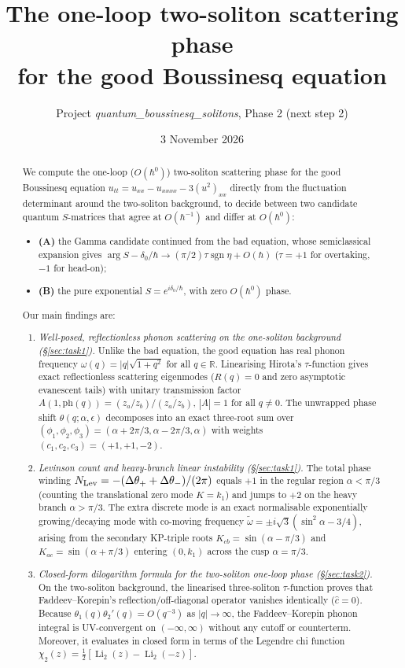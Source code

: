 \documentclass[11pt,a4paper]{article}
\title{The one-loop two-soliton scattering phase\\ for the good Boussinesq equation}
\author{Project \emph{quantum\_boussinesq\_solitons}, Phase 2 (next step 2)}
\date{3 November 2026}
\theoremstyle{remark}
\begin{document}
\maketitle

\begin{abstract}
We compute the one-loop ($O(\hbar^0)$) two-soliton scattering phase for the good Boussinesq equation $u_{tt}=u_{xx}-u_{xxxx}-3(u^2)_{xx}$ directly from the fluctuation determinant around the two-soliton background, to decide between two candidate quantum $S$-matrices that agree at $O(\hbar^{-1})$ and differ at $O(\hbar^0)$:
\begin{itemize}
\item \textbf{(A)} the Gamma candidate continued from the bad equation, whose semiclassical expansion gives $\arg S-\delta_0/\hbar\to(\pi/2)\tau\operatorname{sgn}\eta+O(\hbar)$ ($\tau=+1$ for overtaking, $-1$ for head-on);
\item \textbf{(B)} the pure exponential $S=e^{i\delta_0/\hbar}$, with zero $O(\hbar^0)$ phase.
\end{itemize}
Our main findings are:
\begin{enumerate}
\item \emph{Well-posed, reflectionless phonon scattering on the one-soliton background (\S\ref{sec:task1}).} Unlike the bad equation, the good equation has real phonon frequency $\omega(q)=|q|\sqrt{1+q^2}$ for all $q\in\mathbb{R}$. Linearising Hirota's $\tau$-function gives exact reflectionless scattering eigenmodes ($R(q)=0$ and zero asymptotic evanescent tails) with unitary transmission factor $A(1,\mathrm{ph}(q))=(z_a/z_b)/\overline{(z_a/z_b)}$, $|A|=1$ for all $q\neq 0$. The unwrapped phase shift $\theta(q;\alpha,\epsilon)$ decomposes into an exact three-root sum over $(\phi_1,\phi_2,\phi_3)=(\alpha+2\pi/3,\alpha-2\pi/3,\alpha)$ with weights $(c_1,c_2,c_3)=(+1,+1,-2)$.
\item \emph{Levinson count and heavy-branch linear instability (\S\ref{sec:task1}).} The total phase winding $N_{\rm Lev}=-(\Delta\theta_++\Delta\theta_-)/(2\pi)$ equals $+1$ in the regular region $\alpha<\pi/3$ (counting the translational zero mode $K=k_1$) and jumps to $+2$ on the heavy branch $\alpha>\pi/3$. The extra discrete mode is an exact normalisable exponentially growing/decaying mode with co-moving frequency $\tilde\omega=\pm i\sqrt{3}(\sin^2\alpha-3/4)$, arising from the secondary KP-triple roots $K_{cb}=\sin(\alpha-\pi/3)$ and $K_{ac}=\sin(\alpha+\pi/3)$ entering $(0,k_1)$ across the cusp $\alpha=\pi/3$.
\item \emph{Closed-form dilogarithm formula for the two-soliton one-loop phase (\S\ref{sec:task2}).} On the two-soliton background, the linearised three-soliton $\tau$-function proves that Faddeev--Korepin's reflection/off-diagonal operator vanishes identically ($\hat{c}=0$). Because $\theta_1(q)\theta_2'(q)=O(q^{-3})$ as $|q|\to\infty$, the Faddeev--Korepin phonon integral is UV-convergent on $(-\infty,\infty)$ without any cutoff or counterterm. Moreover, it evaluates in closed form in terms of the Legendre chi function $\chi_2(z)=\tfrac12[\operatorname{Li}_2(z)-\operatorname{Li}_2(-z)]$.

\end{enumerate}
\end{abstract}
\end{document}
